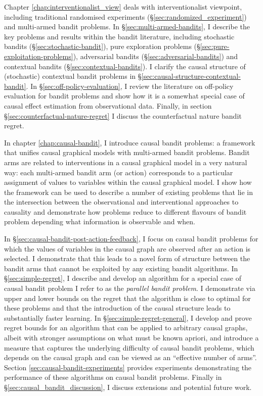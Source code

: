 \documentclass[11pt,a4paper,twoside]{report}
\newcommand{\quotes}[1]{``#1''}
\theoremstyle{plain}
\theoremstyle{definition}
\begin{document}
Chapter \ref{chap:interventionalist_view} deals with interventionalist viewpoint, including traditional randomised experiments (\S\ref{sec:randomized_experiment}) and multi-armed bandit problems. In \S\ref{sec:multi-armed-bandits}, I describe the key problems and results within the bandit literature, including stochastic bandits (\S\ref{sec:stochastic-bandit}), pure exploration problems (\S\ref{sec:pure-exploitation-problems}), adversarial bandits (\S\ref{sec:adversarial-bandits}) and contextual bandits (\S\ref{sec:contextual-bandits}). I clarify the causal structure of (stochastic) contextual bandit problems in \S\ref{sec:causal-structure-contextual-bandit}. In \S\ref{sec:off-policy-evaluation}, I review the literature on off-policy evaluation for bandit problems and show how it is a somewhat special case of causal effect estimation from observational data. Finally, in section \S\ref{sec:counterfactual-nature-regret} I discuss the counterfactual nature bandit regret. 

In chapter \ref{chap:causal-bandit}, I introduce causal bandit problems: a framework that unifies causal graphical models with multi-armed bandit problems. Bandit arms are related to interventions in a causal graphical model in a very natural way: each multi-armed bandit arm (or action) corresponds to a particular assignment of values to variables within the causal graphical model. I show how the framework can be used to describe a number of existing problems that lie in the intersection between the observational and interventional approaches to causality and demonstrate how problems reduce to different flavours of bandit problem depending what information is observable and when. 

In \S\ref{sec:causal-bandit-post-action-feedback}, I focus on causal bandit problems for which the values of variables in the causal graph are observed after an action is selected. I demonstrate that this leads to a novel form of structure between the bandit arms that cannot be exploited by any existing bandit algorithms. In \S\ref{sec:simple-regret}, I describe and develop an algorithm for a special case of causal bandit problem I refer to as the \emph{parallel bandit problem}. I demonstrate via upper and lower bounds on the regret that the algorithm is close to optimal for these problems and that the introduction of the causal structure leads to substantially faster learning. In \S\ref{sec:simple-regret-general}, I develop and prove regret bounds for an algorithm that can be applied to arbitrary causal graphs, albeit with stronger assumptions on what must be known apriori, and introduce a measure that captures the underlying difficulty of causal bandit problems, which depends on the causal graph and can be viewed as an \quotes{effective number of arms}. Section \ref{sec:causal-bandit-experiments} provides experiments demonstrating the performance of these algorithms on causal bandit problems. Finally in \S\ref{sec:causal_bandit_discussion}, I discuss extensions and potential future work. 
\end{document}
